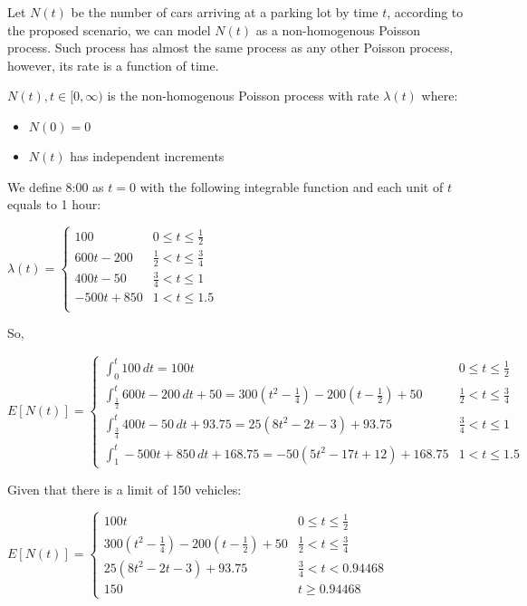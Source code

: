 \documentclass[]{article}
\providecommand{\tightlist}{%
  \setlength{\itemsep}{0pt}\setlength{\parskip}{0pt}}
\begin{document}
Let \textbf{\(N(t)\)} be the number of cars arriving at a parking lot by
time \textbf{\(t\)}, according to the proposed scenario, we can model
\textbf{\(N(t)\)} as a non-homogenous Poisson process. Such process has
almost the same process as any other Poisson process, however, its rate
is a function of time.

\(N(t), t \in [0, \infty)\) is the non-homogenous Poisson process with
rate \(\lambda (t)\) where:

\begin{itemize}
\tightlist
\item
  \(N(0) = 0\)
\item
  \(N(t)\) has independent increments
\end{itemize}

We define 8:00 as \(t=0\) with the following integrable function and
each unit of \(t\) equals to 1 hour:

\(\lambda (t) = \begin{cases} 100 & 0 \leq t \leq \frac{1}{2} \\ 600t - 200 & \frac{1}{2} < t \leq \frac{3}{4} \\ 400t - 50 & \frac{3}{4} < t \leq 1 \\ -500t + 850 & 1 < t \leq 1.5 \\ \end{cases}\)

So,

\(E[N(t)] = \begin{cases} \int_{0}^t 100\,dt = 100t & 0 \leq t \leq \frac{1}{2} \\ \int_{\frac{1}{2}}^t 600t - 200 \,dt + 50 = 300(t^2 - \frac{1}{4}) - 200(t - \frac{1}{2}) + 50 & \frac{1}{2} < t \leq \frac{3}{4} \\ \int_{\frac{3}{4}}^t 400t - 50 \,dt + 93.75 = 25(8t^2 - 2t - 3) + 93.75 & \frac{3}{4} < t \leq 1 \\ \int_{1}^t -500t + 850\,dt + 168.75 = -50(5t^2 - 17t + 12) + 168.75 & 1 < t \leq 1.5 \end{cases}\)

Given that there is a limit of 150 vehicles:

\(E[N(t)] = \begin{cases} 100t & 0 \leq t \leq \frac{1}{2} \\ 300(t^2 - \frac{1}{4}) - 200(t - \frac{1}{2}) + 50 & \frac{1}{2} < t \leq \frac{3}{4} \\ 25(8t^2 - 2t - 3) + 93.75 & \frac{3}{4} < t < 0.94468 \\ 150 & t \geq 0.94468 \end{cases}\)
\end{document}
